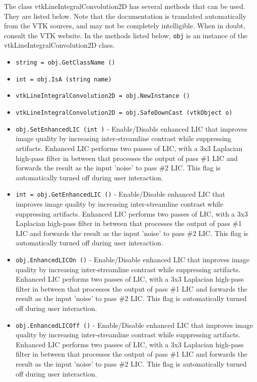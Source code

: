 The class vtkLineIntegralConvolution2D has several methods that can be used.
  They are listed below.
Note that the documentation is translated automatically from the VTK sources,
and may not be completely intelligible.  When in doubt, consult the VTK website.
In the methods listed below, \verb|obj| is an instance of the vtkLineIntegralConvolution2D class.
\begin{itemize}
\item  \verb|string = obj.GetClassName ()|

\item  \verb|int = obj.IsA (string name)|

\item  \verb|vtkLineIntegralConvolution2D = obj.NewInstance ()|

\item  \verb|vtkLineIntegralConvolution2D = obj.SafeDownCast (vtkObject o)|

\item  \verb|obj.SetEnhancedLIC (int )| -  Enable/Disable enhanced LIC that improves image quality by increasing
 inter-streamline contrast while suppressing artifacts. Enhanced LIC
 performs two passes of LIC, with a 3x3 Laplacian high-pass filter in
 between that processes the output of pass \#1 LIC and forwards the result
 as the input 'noise' to pass \#2 LIC. This flag is automatically turned
 off during user interaction.

\item  \verb|int = obj.GetEnhancedLIC ()| -  Enable/Disable enhanced LIC that improves image quality by increasing
 inter-streamline contrast while suppressing artifacts. Enhanced LIC
 performs two passes of LIC, with a 3x3 Laplacian high-pass filter in
 between that processes the output of pass \#1 LIC and forwards the result
 as the input 'noise' to pass \#2 LIC. This flag is automatically turned
 off during user interaction.

\item  \verb|obj.EnhancedLICOn ()| -  Enable/Disable enhanced LIC that improves image quality by increasing
 inter-streamline contrast while suppressing artifacts. Enhanced LIC
 performs two passes of LIC, with a 3x3 Laplacian high-pass filter in
 between that processes the output of pass \#1 LIC and forwards the result
 as the input 'noise' to pass \#2 LIC. This flag is automatically turned
 off during user interaction.

\item  \verb|obj.EnhancedLICOff ()| -  Enable/Disable enhanced LIC that improves image quality by increasing
 inter-streamline contrast while suppressing artifacts. Enhanced LIC
 performs two passes of LIC, with a 3x3 Laplacian high-pass filter in
 between that processes the output of pass \#1 LIC and forwards the result
 as the input 'noise' to pass \#2 LIC. This flag is automatically turned
 off during user interaction.


\end{itemize}
